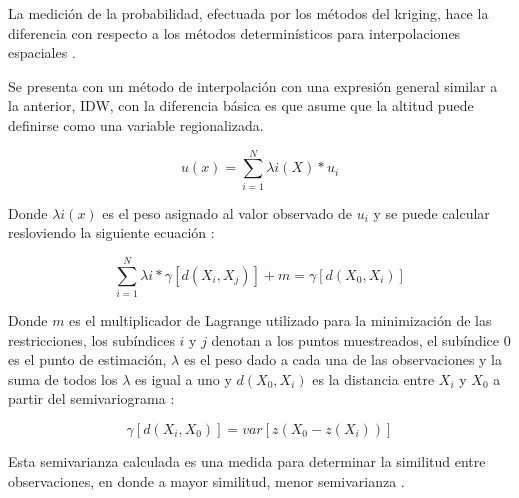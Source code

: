 La medición de la probabilidad, efectuada por los métodos del kriging, hace la diferencia con
respecto a los métodos determinísticos para interpolaciones espaciales
\citep{villatoro2007comparacion}.

Se presenta con un método de interpolación con una expresión general similar a la anterior, IDW,
con la diferencia básica es que asume que la altitud puede definirse como una variable
regionalizada.

\begin{equation}\label{eq:interpolacion-kriging}
 u(x) = \sum_{i=1}^{N} \lambda{i}(X) * u_{i}
\end{equation}

Donde $\lambda{i}(x)$ es el peso asignado al valor observado de $u_{i}$ y se puede calcular
resloviendo la siguiente ecuación :

\begin{equation}\label{eq:interpolacion-peso-kriging}
\sum_{i=1}^{N} \lambda{i}  * \gamma[d(X_{i}, X_{j})] + m = \gamma[d(X_{0}, X_{i})]
\end{equation}

Donde $m$ es el multiplicador de Lagrange utilizado para la minimización de las restricciones,
los subíndices $i$ y $j$ denotan a los puntos muestreados, el subíndice $0$ es el punto de
estimación, $\lambda$ es el peso dado a cada una de las observaciones y la suma de todos los
$\lambda$ es igual a uno y $d(X_{0}, X_{i})$ es la distancia entre $X_{i}$ y $X_{0}$ a partir del
semivariograma \citep{villatoro2007comparacion}:

\begin{equation}\label{eq:interpolacion-semivariograma}
\gamma[d(X_{i}, X_{0})] = var[z(X_{0} - z(X_{i}))]
\end{equation}

Esta semivarianza calculada es una medida para determinar la similitud entre observaciones, en
donde a mayor similitud, menor semivarianza \citep{villatoro2007comparacion}.
